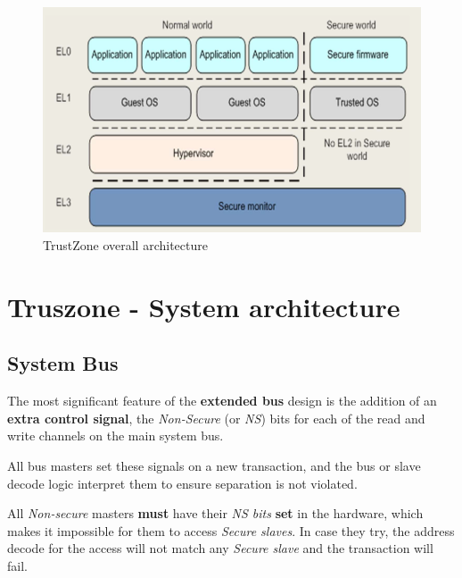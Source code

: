 \begin{figure}[htbp]
   \centering
   \includegraphics{images/TrustZone_architecture.png}
   \caption{TrustZone overall architecture}
   \label{fig:TrustZone_architecture}
\end{figure}

\section{Truszone - System architecture}
\subsection{System Bus}

The most significant feature of the \textbf{extended bus} design is the addition of an
\textbf{extra control signal}, the \textit{Non-Secure} (or \textit{NS}) bits for each of the read and write
channels on the main system bus.

All bus masters set these signals on a new transaction, and the bus or slave
decode logic interpret them to ensure separation is not violated.

All \textit{Non-secure} masters \textbf{must} have their \textit{NS bits} \textbf{set} in the hardware, which
makes it impossible for them to access \textit{Secure slaves}.
In case they try, the address decode for
the access will not match any \textit{Secure slave} and the transaction will fail.


